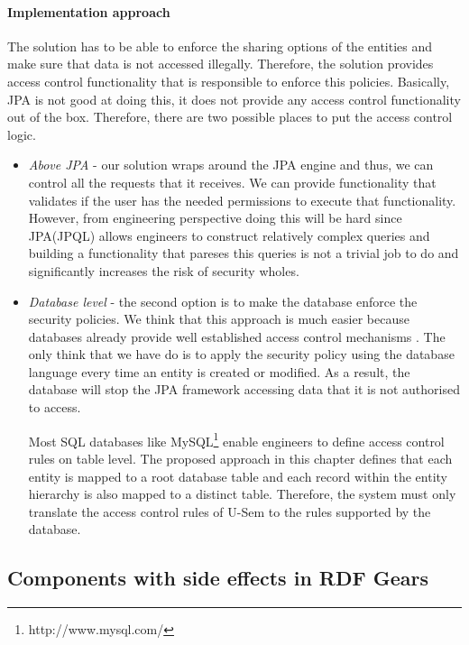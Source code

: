 \paragraph{Implementation approach}

The solution has to be able to enforce the sharing options of the entities and make sure that data is not accessed illegally. Therefore, the solution provides access control functionality that is responsible to enforce this policies. Basically, JPA is not good at doing this, it does not provide any access control functionality out of the box. Therefore, there are two possible places to put the access control logic. 

\begin{itemize}
	\item \textit{Above JPA} - our solution wraps around the JPA engine and thus, we can control all the requests that it receives. We can provide functionality that validates if the user has the needed permissions to execute that functionality. However, from engineering perspective doing this will be hard since JPA(JPQL) allows engineers to construct relatively complex queries and building a functionality that pareses this queries is not a trivial job to do and significantly increases the risk of security wholes.
	
	\item \textit{Database level} - the second option is to make the database enforce the security policies. We think that this approach is much easier because databases already provide well established access control mechanisms \cite{olson2008formal}. The only think that we have do is to apply the security policy using the database language every time an entity is created or modified. As a result, the database will stop the JPA framework accessing data that it is not authorised to access.
	
	
Most SQL databases like MySQL\footnote{http://www.mysql.com/} enable engineers to define access control rules on table level. The proposed approach in this chapter defines that each entity is mapped to a root database table and each record within the entity hierarchy is also mapped to a distinct table. Therefore, the system must only translate the access control rules of U-Sem to the rules supported by the database.
\end{itemize}


\subsection{Components with side effects in RDF Gears}

